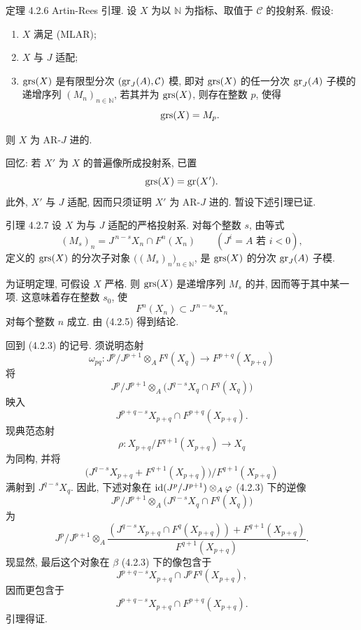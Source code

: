 \begin{statement}{定理 4.2.6}
Artin-Rees 引理. 设 \(X\) 为以 \(\mathbb N\) 为指标、取值于 \(\mathcal C\) 的投射系. 假设:
\begin{enumerate}[label=\textup{(\roman*)}]
\item \(X\) 满足 (MLAR);
\item \(X\) 与 \(J\) 适配;
\item \(\operatorname{grs}(X)\) 是有限型分次 \((\operatorname{gr}_J(A),\mathcal C)\) 模, 即对 \(\operatorname{grs}(X)\) 的任一分次 \(\operatorname{gr}_J(A)\) 子模的递增序列 \((M_n)_{n\in\mathbb N}\), 若其并为 \(\operatorname{grs}(X)\), 则存在整数 \(p\), 使得
\[
\operatorname{grs}(X)=M_p.
\]
\end{enumerate}
则 \(X\) 为 AR-\(J\) 进的.
\end{statement}

\begin{prooftext}
回忆: 若 \(X'\) 为 \(X\) 的普遍像所成投射系, 已置
\[
\operatorname{grs}(X)=\operatorname{gr}(X').
\]
此外, \(X'\) 与 \(J\) 适配, 因而只须证明 \(X'\) 为 AR-\(J\) 进的. 暂设下述引理已证.
\end{prooftext}

\begin{statement}{引理 4.2.7}
设 \(X\) 为与 \(J\) 适配的严格投射系. 对每个整数 \(s\), 由等式
\[
(M_s)_n=J^{\,n-s}X_n\cap F^n(X_n)\qquad(J^i=A\text{ 若 }i<0),
\]
定义的 \(\operatorname{grs}(X)\) 的分次子对象 \(\bigl((M_s)_n\bigr)_{n\in\mathbb N}\), 是 \(\operatorname{grs}(X)\) 的分次 \(\operatorname{gr}_J(A)\) 子模.
\end{statement}

为证明定理, 可假设 \(X\) 严格. 则 \(\operatorname{grs}(X)\) 是递增序列 \(M_s\) 的并, 因而等于其中某一项. 这意味着存在整数 \(s_0\), 使
\[
F^n(X_n)\subset J^{\,n-s_0}X_n
\]
对每个整数 \(n\) 成立. 由 (4.2.5) 得到结论.

\begin{prooftext}[4.2.7 的证明]
回到 (4.2.3) 的记号. 须说明态射
\[
\omega_{pq}:J^p/J^{p+1}\otimes_A F^q(X_q)\longrightarrow F^{p+q}(X_{p+q})
\]
将
\[
J^p/J^{p+1}\otimes_A
\bigl(J^{q-s}X_q\cap F^q(X_q)\bigr)
\]
映入
\[
J^{p+q-s}X_{p+q}\cap F^{p+q}(X_{p+q}).
\]
现典范态射
\[
\rho:X_{p+q}/F^{q+1}(X_{p+q})\longrightarrow X_q
\]
为同构, 并将
\[
\bigl(J^{q-s}X_{p+q}+F^{q+1}(X_{p+q})\bigr)/F^{q+1}(X_{p+q})
\]
满射到 \(J^{q-s}X_q\). 因此,
下述对象在 \(\operatorname{id}(J^p/J^{p+1})\otimes_A\varphi\) (4.2.3) 下的逆像
\[
J^p/J^{p+1}\otimes_A
\bigl(J^{q-s}X_q\cap F^q(X_q)\bigr)
\]
为
\[
J^p/J^{p+1}\otimes_A
\frac{(J^{q-s}X_{p+q}\cap F^q(X_{p+q}))+F^{q+1}(X_{p+q})}
     {F^{q+1}(X_{p+q})}.
\]
现显然, 最后这个对象在 \(\beta\) (4.2.3) 下的像包含于
\[
J^{p+q-s}X_{p+q}\cap J^pF^q(X_{p+q}),
\]
因而更包含于
\[
J^{p+q-s}X_{p+q}\cap F^{p+q}(X_{p+q}).
\]
引理得证.
\end{prooftext}

